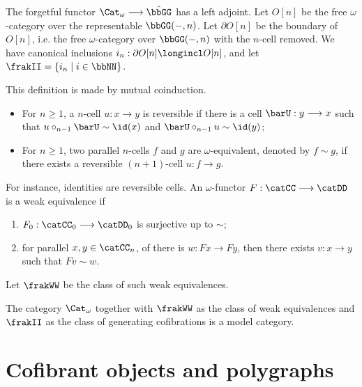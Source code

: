 \documentclass{article}
\newcommand{\Weq}{\frakWW}
\begin{document}
The forgetful functor $\Cat_\omega \longrightarrow \hat{\bbGG}$ has a left adjoint. Let $O[n]$ be the free $\omega$-category over the representable $\bbGG (-, n)$. Let $\partial O [n]$ be the boundary of $O [n]$, i.e. the free $\omega$-category over $\bbGG (-, n)$ with the $n$-cell removed. We have canonical inclusions $i_n : \partial O [n] \longincl O [n]$, and let $\frakII = \{ i_n \mid i \in \bbNN \}$.

\begin{definition}
This definition is made by mutual coinduction.
\begin{itemize}
	\item For $n \geq 1$, a $n$-cell $u : x \longrightarrow y$ is reversible if there is a cell $\barU : y \longrightarrow x$ such that $u \circ_{n-1} \barU \sim \id (x)$ and $\barU \circ_{n-1} u \sim \id (y)$;
	\item For $n \geq 1$, two parallel $n$-cells $f$ and $g$ are $\omega$-equivalent, denoted by $f \sim g$, if there exists a reversible $(n+1)$-cell $u : f \longrightarrow g$.
\end{itemize}
\end{definition}

For instance, identities are reversible cells. An $\omega$-functor $F : \catCC \longrightarrow \catDD$ is a weak equivalence if
\begin{enumerate}
	\item $F_0 : \catCC_0 \longrightarrow \catDD_0$ is surjective up to $\sim$;
	\item for parallel $x, y \in \catCC_n$, of there is $w : Fx \longrightarrow Fy$, then there exists $v : x \longrightarrow y$ such that $Fv \sim w$.
\end{enumerate}
Let $\Weq$ be the class of such weak equivalences.

\begin{theorem}
The category $\Cat_\omega$ together with $\Weq$ as the class of weak equivalences and $\frakII$ as the class of generating cofibrations is a model category.
\end{theorem}


\section{Cofibrant objects and polygraphs}
\end{document}
